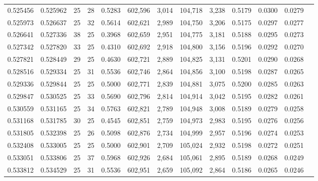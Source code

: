 \begin{tabular}{rrrrrrrrrrrrr}
0.525456 & 0.525962 &    25 &  28 &                                     0.5283 & 602,596 &   3,014 & 104,718 &   3,238 & 0.5179 & 0.0300 & 0.0279 \\
0.525973 & 0.526637 &    25 &  32 &                                     0.5614 & 602,621 &   2,989 & 104,750 &   3,206 & 0.5175 & 0.0297 & 0.0277 \\
0.526641 & 0.527336 &    38 &  25 &                                     0.3968 & 602,659 &   2,951 & 104,775 &   3,181 & 0.5188 & 0.0295 & 0.0273 \\
0.527342 & 0.527820 &    33 &  25 &                                     0.4310 & 602,692 &   2,918 & 104,800 &   3,156 & 0.5196 & 0.0292 & 0.0270 \\
0.527821 & 0.528449 &    29 &  25 &                                     0.4630 & 602,721 &   2,889 & 104,825 &   3,131 & 0.5201 & 0.0290 & 0.0268 \\
0.528516 & 0.529334 &    25 &  31 &                                     0.5536 & 602,746 &   2,864 & 104,856 &   3,100 & 0.5198 & 0.0287 & 0.0265 \\
0.529336 & 0.529844 &    25 &  25 &                                     0.5000 & 602,771 &   2,839 & 104,881 &   3,075 & 0.5200 & 0.0285 & 0.0263 \\
0.529847 & 0.530525 &    25 &  33 &                                     0.5690 & 602,796 &   2,814 & 104,914 &   3,042 & 0.5195 & 0.0282 & 0.0261 \\
0.530559 & 0.531165 &    25 &  34 &                                     0.5763 & 602,821 &   2,789 & 104,948 &   3,008 & 0.5189 & 0.0279 & 0.0258 \\
0.531168 & 0.531785 &    30 &  25 &                                     0.4545 & 602,851 &   2,759 & 104,973 &   2,983 & 0.5195 & 0.0276 & 0.0256 \\
0.531805 & 0.532398 &    25 &  26 &                                     0.5098 & 602,876 &   2,734 & 104,999 &   2,957 & 0.5196 & 0.0274 & 0.0253 \\
0.532408 & 0.533005 &    25 &  25 &                                     0.5000 & 602,901 &   2,709 & 105,024 &   2,932 & 0.5198 & 0.0272 & 0.0251 \\
0.533051 & 0.533806 &    25 &  37 &                                     0.5968 & 602,926 &   2,684 & 105,061 &   2,895 & 0.5189 & 0.0268 & 0.0249 \\
0.533812 & 0.534529 &    25 &  31 &                                     0.5536 & 602,951 &   2,659 & 105,092 &   2,864 & 0.5186 & 0.0265 & 0.0246 \\

\end{tabular}
